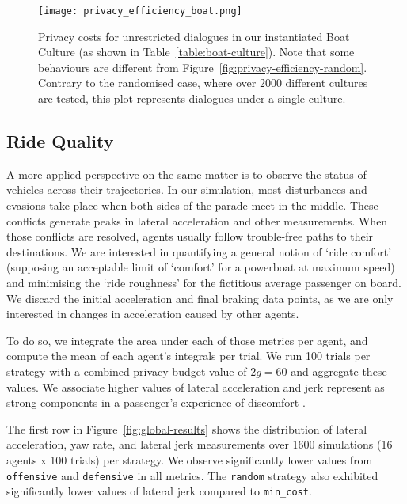 \documentclass[acmsmall]{custom-arxiv}  %
\begin{document}
\begin{figure}
\centering
\texttt{[image: privacy\_efficiency\_boat.png]}
\caption{Privacy costs for unrestricted dialogues in our instantiated Boat Culture (as shown in Table~\ref{table:boat-culture}). Note that some behaviours are different from Figure~\ref{fig:privacy-efficiency-random}. Contrary to the randomised case, where over 2000 different cultures are tested, this plot represents dialogues under a single culture.}
\label{fig:privacy-efficiency}
\end{figure}

\subsection{Ride Quality}

A more applied perspective on the same matter is to observe the status of vehicles across their trajectories. In our simulation, most disturbances and evasions take place when both sides of the parade meet in the middle. These conflicts generate peaks in lateral acceleration and other measurements. When those conflicts are resolved, agents usually follow trouble-free paths to their destinations.
We are interested in quantifying a general notion of `ride comfort' (supposing an acceptable limit of `comfort' for a powerboat at maximum speed) and minimising the `ride roughness' for the fictitious average passenger on board. We discard the initial acceleration and final braking data points, as we are only interested in changes in acceleration caused by other agents.


To do so, we integrate the area under each of those metrics per agent, and compute the mean of each agent's integrals per trial. We run 100 trials per strategy with a combined privacy budget value of $2g = 60$ and aggregate these values. We associate higher values of lateral acceleration and jerk represent as strong components in a passenger's experience of discomfort \citep{Nguyen2019InsightSingapore}. 

The first row in Figure~\ref{fig:global-results} shows the distribution of lateral acceleration, yaw rate, and lateral jerk measurements over 1600 simulations (16 agents x 100 trials) per strategy. We observe significantly lower values from \texttt{offensive} and \texttt{defensive} in all metrics. The \texttt{random} strategy also exhibited significantly lower values of lateral jerk compared to \texttt{min\_cost}.
\end{document}
